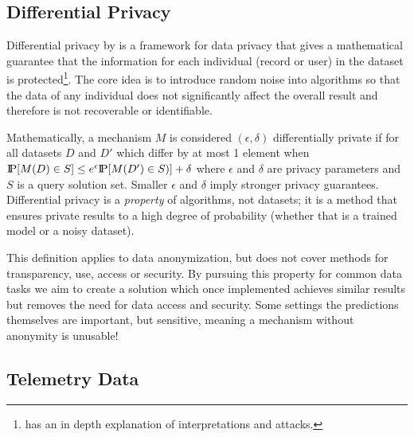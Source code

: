 \documentclass[12pt,letterpaper]{article}
\begin{document}
\subsection{Differential Privacy}

Differential privacy by \cite{DworkRoth} is a framework for data privacy that gives a mathematical guarantee that the information for each individual (record or user) in the dataset is protected\footnote{\cite{DP-def} has an in depth explanation of interpretations and attacks.}. The core idea is to introduce random noise into algorithms so that the data of any individual does not significantly affect the overall result and therefore is not recoverable or identifiable. 

Mathematically, a mechanism $M$ is considered $(\epsilon, \delta)$ differentially private if for all datasets $D$ and $D'$ which differ by at most 1 element when $\P [ M(D)\in S ] \leq e^\epsilon \P [ M(D') \in S)] + \delta$ where $\epsilon$ and $\delta$ are privacy parameters and $S$ is a query solution set. Smaller $\epsilon$ and $\delta$ imply stronger privacy guarantees. Differential privacy is a \textit{property} of algorithms, not datasets; it is a method that ensures private results to a high degree of probability (whether that is a trained model or a noisy dataset). 

This definition applies to data anonymization, but does not cover methods for transparency, use, access or security. By pursuing this property for common data tasks we aim to create a solution which once implemented achieves similar results but removes the need for data access and security. Some settings the predictions themselves are important, but sensitive, meaning a mechanism without anonymity is unusable!

\subsection{Telemetry Data}
\end{document}
